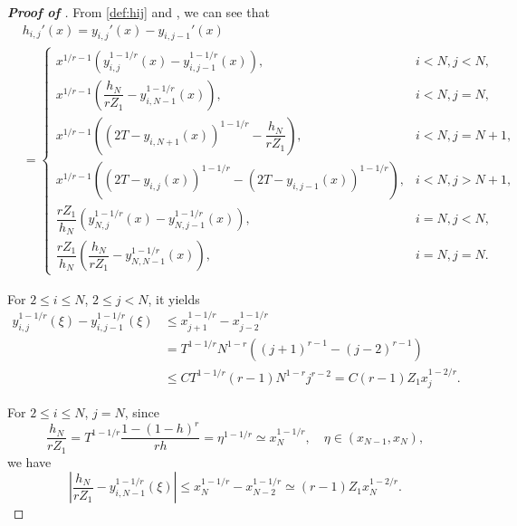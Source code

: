\documentclass{amsart}
\theoremstyle{definition}
\theoremstyle{remark}
\numberwithin{equation}{section}
\begin{document}
\begin{proof} [\bf Proof of ]
  From \eqref{def:hij} and , we can see that
  \begin{equation*}
    \begin{aligned}
      & h_{i,j}'(x) = y_{i,j}'(x) - y_{i,j-1}'(x) \\ 
      &=\begin{cases}
        x^{1/r-1} \left( y_{i,j}^{1-1/r}(x) - y_{i,j-1}^{1-1/r}(x) \right) ,& i< N, j< N, \\
        x^{1/r-1} \left( \dfrac{h_N}{r Z_1} - y_{i,N-1}^{1-1/r}(x) \right)  ,& i< N, j=N, \\
        x^{1/r-1} \left( (2T-y_{i,N+1}(x))^{1-1/r} - \dfrac{h_N}{r Z_1}  \right)   ,& i< N, j=N+1, \\
        x^{1/r-1} \left( (2T-y_{i,j}(x))^{1-1/r} - (2T-y_{i,j-1}(x))^{1-1/r} \right)   ,& i< N, j>N+1, \\
        \dfrac{rZ_1}{h_N} \left( y_{N,j}^{1-1/r}(x) - y_{N,j-1}^{1-1/r}(x) \right)  ,& i=N, j< N ,\\
        \dfrac{rZ_1}{h_N} \left( \dfrac{h_N}{rZ_1} - y_{N,N-1}^{1-1/r}(x) \right)   ,& i=N, j=N .
      \end{cases}
    \end{aligned}
  \end{equation*}
  
  For \(2\le i\le N\), \(2\le j < N\), it yields%
  \begin{equation} \label{eq:yij1-1/r-j-1}
    \begin{aligned}
      y_{i,j}^{1-1/r}(\xi) - y_{i,j-1}^{1-1/r}(\xi)
      &\le x_{j+1}^{1-1/r} - x_{j-2}^{1-1/r}  \\
      &= T^{1-1/r} N^{1-r} \left( (j+1)^{r-1} - (j-2)^{r-1} \right) \\
      & \le C T^{1-1/r} (r-1) N^{1-r} j^{r-2} = C  (r-1) Z_1 x_j^{1-2/r}.
    \end{aligned}
  \end{equation}
  
  For $2\le i\le N$, \(j=N\), since %
  \begin{equation} \label{eq:hN/rZ1}
    \dfrac{h_N}{r Z_1} = T^{1-1/r} \dfrac{1 - (1-h)^r}{rh} = \eta^{1-1/r} \simeq x_N^{1-1/r}, \quad \eta \in (x_{N-1}, x_{N}),
  \end{equation}
  we have
  \begin{equation*} \label{eq:hN/rZ1-yj=N-1}
    |\dfrac{h_N}{r Z_1} - y_{i,N-1}^{1-1/r}(\xi)| \le x_N^{1-1/r} - x_{N-2}^{1-1/r} \simeq (r-1) Z_1 x_N^{1-2/r}.
  \end{equation*}
  

\end{proof}
\end{document}
